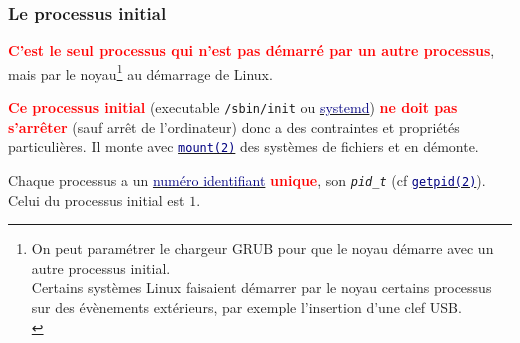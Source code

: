 \documentclass[lualatex,11pt,a4paper,svgnames,french]{beamer}
\newcommand{\clbrougras}[1]{{\textcolor{Red}{\textbf{#1}}}}
\begin{document}
\begin{frame}\frametitle{Le processus initial}
  \clbrougras{C'est le seul processus qui n'est pas démarré par un
    autre processus}, mais par le noyau\footnote{On peut paramétrer le
  chargeur GRUB pour que le noyau démarre avec un autre processus
  initial.\\ Certains systèmes Linux faisaient démarrer par le noyau
  certains processus sur des évènements extérieurs, par exemple
  l'insertion d'une clef USB.\\} au démarrage de Linux.

  \bigskip
  
  \clbrougras{Ce processus initial} (executable \texttt{/sbin/init} ou
  \href{https://fr.wikipedia.org/wiki/Systemd}{\textcolor{Navy}{systemd}})
  \clbrougras{ne doit pas s'arrêter} (sauf arrêt de l'ordinateur) donc
  a des contraintes et propriétés particulières. Il monte avec
  \href{https://man7.org/linux/man-pages/man2/mount.2.html}{\texttt{\textcolor{Navy}{mount(2)}}}
   des systèmes de fichiers et en démonte.

  \bigskip

  Chaque processus a un
  \href{https://fr.wikipedia.org/wiki/Identifiant_de_processus}{\textcolor{Navy}{numéro
      identifiant}} \clbrougras{unique}, son \texttt{\textit{pid\_t}} (cf
  \href{https://man7.org/linux/man-pages/man2/getpid.2.html}{\textcolor{Navy}{\texttt{getpid(2)}}}). Celui
  du processus initial est $1$.
\end{frame}
\end{document}
